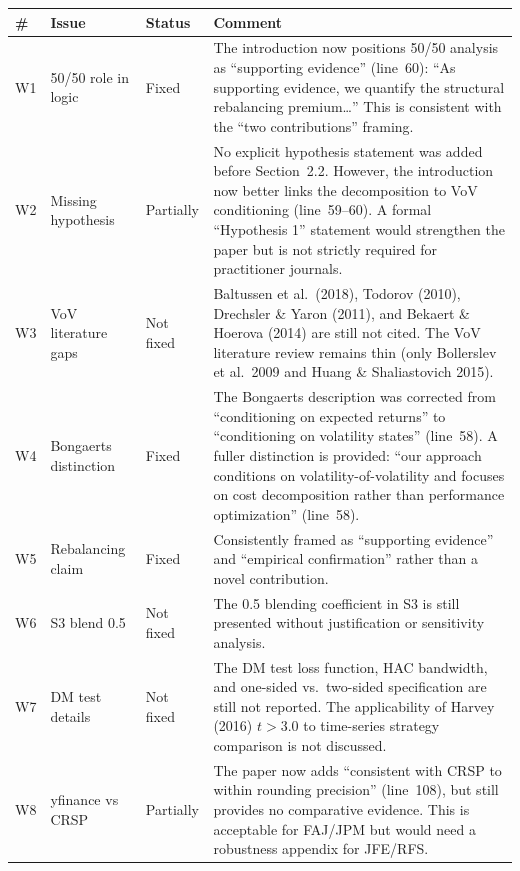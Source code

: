 \documentclass[12pt,a4paper]{article}
\begin{document}
\begin{longtable}{p{0.6cm}p{2.2cm}p{2cm}p{8.5cm}}
\toprule
\# & Issue & Status & Comment \\
\midrule
W1 & 50/50 role in logic & \textcolor{okgreen}{Fixed} & The introduction now positions 50/50 analysis as ``supporting evidence'' (line~60): ``As supporting evidence, we quantify the structural rebalancing premium\ldots'' This is consistent with the ``two contributions'' framing. \\
\midrule
W2 & Missing hypothesis & \textcolor{warncolor}{Partially} & No explicit hypothesis statement was added before Section~2.2. However, the introduction now better links the decomposition to VoV conditioning (line~59--60). A formal ``Hypothesis 1'' statement would strengthen the paper but is not strictly required for practitioner journals. \\
\midrule
W3 & VoV literature gaps & \textcolor{warncolor}{Not fixed} & Baltussen et al.\ (2018), Todorov (2010), Drechsler \& Yaron (2011), and Bekaert \& Hoerova (2014) are still not cited. The VoV literature review remains thin (only Bollerslev et al.\ 2009 and Huang \& Shaliastovich 2015). \\
\midrule
W4 & Bongaerts distinction & \textcolor{okgreen}{Fixed} & The Bongaerts description was corrected from ``conditioning on expected returns'' to ``conditioning on volatility states'' (line~58). A fuller distinction is provided: ``our approach conditions on volatility-of-volatility and focuses on cost decomposition rather than performance optimization'' (line~58). \\
\midrule
W5 & Rebalancing claim & \textcolor{okgreen}{Fixed} & Consistently framed as ``supporting evidence'' and ``empirical confirmation'' rather than a novel contribution. \\
\midrule
W6 & S3 blend 0.5 & \textcolor{warncolor}{Not fixed} & The 0.5 blending coefficient in S3 is still presented without justification or sensitivity analysis. \\
\midrule
W7 & DM test details & \textcolor{warncolor}{Not fixed} & The DM test loss function, HAC bandwidth, and one-sided vs.\ two-sided specification are still not reported. The applicability of Harvey (2016) $t > 3.0$ to time-series strategy comparison is not discussed. \\
\midrule
W8 & yfinance vs CRSP & \textcolor{okgreen}{Partially} & The paper now adds ``consistent with CRSP to within rounding precision'' (line~108), but still provides no comparative evidence. This is acceptable for FAJ/JPM but would need a robustness appendix for JFE/RFS. \\

\end{longtable}
\end{document}

